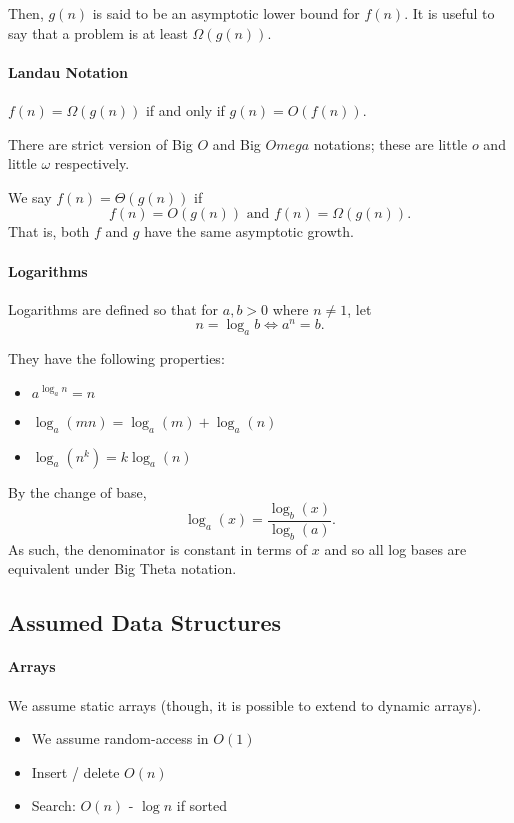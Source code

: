 Then, \(g(n)\) is said to be an asymptotic lower bound for \(f(n)\).
It is useful to say that a problem is at least \(\Omega(g(n))\).

\paragraph{Landau Notation}
\(f(n) = \Omega (g(n))\) if and only if \(g(n) = O(f(n))\).

There are strict version of Big \(O\) and Big \(Omega\) notations; these are little \(o\) and little \(\omega\) respectively.

We say \(f(n) = \Theta(g(n))\) if
\[
    f(n) = O(g(n)) \text{ and } f(n) = \Omega(g(n)).
\]
That is, both \(f\) and \(g\) have the same asymptotic growth.


\paragraph{Logarithms}
Logarithms are defined so that for \(a, b > 0\) where \(n \neq 1\),
let \[ n = \log_a b \Leftrightarrow a^n = b.\]

They have the following properties:
\begin{itemize}
    \item \(a^{\log_a n} = n\)
    \item \(\log_a (mn) = \log_a (m) + \log_a(n)\)
    \item \(\log_a (n^k) = k\log_a (n)\)
\end{itemize}

By the change of base,
\[
    \log_a(x) = \frac{\log_b (x)}{\log_b (a)}.
\]
As such, the denominator is constant in terms of \(x\) and so all log bases are equivalent under Big Theta notation.

\subsection{Assumed Data Structures}

\paragraph{Arrays}
We assume static arrays (though, it is possible to extend to dynamic arrays).

\begin{itemize}
    \item We assume random-access in \(O(1)\)
    \item Insert / delete \(O(n)\)
    \item Search: \(O(n)\) - \(\log n\) if sorted
\end{itemize}

